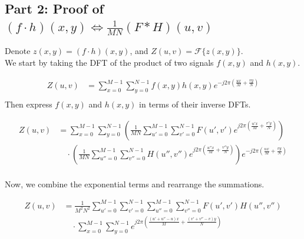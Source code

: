 \documentclass[UTF8]{ctexart}
\begin{document}
\subsection*{Part 2: Proof of \( (f \cdot h)(x, y) \Leftrightarrow \frac{1}{MN}(F * H)(u, v) \)}

Denote $z(x,y) = (f \cdot h)(x, y)$, and $Z(u,v) = \mathcal{F}\{z(x,y)\}$.\\
We start by taking the DFT of the product of two signals \( f(x, y) \) and \( h(x, y) \).

\begin{equation*}
\begin{aligned}
Z(u,v) &= \sum_{x=0}^{M-1} \sum_{y=0}^{N-1} f(x, y) h(x, y) e^{-j2\pi \left( \frac{ux}{M} + \frac{vy}{N} \right)} \\
\end{aligned}
\end{equation*}
Then express \( f(x, y) \) and \( h(x, y) \) in terms of their inverse DFTs.

\begin{equation*}
\begin{aligned}
Z(u,v) &= \sum_{x=0}^{M-1} \sum_{y=0}^{N-1} \left( \frac{1}{MN} \sum_{u'=0}^{M-1} \sum_{v'=0}^{N-1} F(u', v') e^{j2\pi \left( \frac{u'x}{M} + \frac{v'y}{N} \right)} \right) \\
& \quad \cdot \left( \frac{1}{MN} \sum_{u''=0}^{M-1} \sum_{v''=0}^{N-1} H(u'', v'') e^{j2\pi \left( \frac{u''x}{M} + \frac{v''y}{N} \right)} \right) e^{-j2\pi \left( \frac{ux}{M} + \frac{vy}{N} \right)} \\
\end{aligned}
\end{equation*}

Now, we combine the exponential terms and rearrange the summations.

\begin{equation*}
\begin{aligned}
Z(u,v) &= \frac{1}{M^2 N^2} \sum_{u'=0}^{M-1} \sum_{v'=0}^{N-1} \sum_{u''=0}^{M-1} \sum_{v''=0}^{N-1} F(u', v') H(u'', v'') \\
& \quad \cdot \sum_{x=0}^{M-1} \sum_{y=0}^{N-1} e^{j2\pi \left( \frac{(u' + u'' - u)x}{M} + \frac{(v' + v'' - v)y}{N} \right)} \\
\end{aligned}
\end{equation*}
\end{document}
